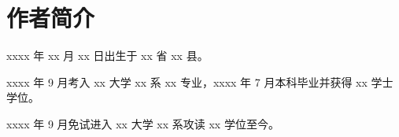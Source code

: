 \chapter{作者简介}
xxxx 年 xx 月 xx 日出生于 xx 省 xx 县。

xxxx 年 9 月考入 xx 大学 xx 系 xx 专业，xxxx 年 7 月本科毕业并获得 xx 学士学位。

xxxx 年 9 月免试进入 xx 大学 xx 系攻读 xx 学位至今。